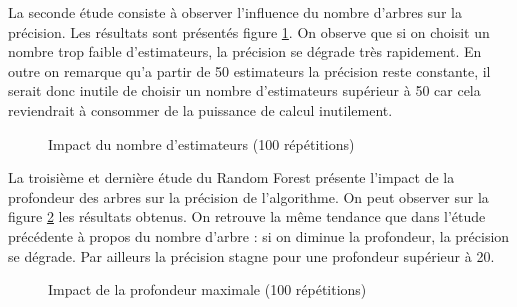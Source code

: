 \documentclass[11pt,a4paper]{article}
\begin{document}
			La seconde étude consiste à observer l'influence du nombre d'arbres sur la précision. Les résultats sont présentés figure \ref{rf_estimators}. On observe que si on choisit un nombre trop faible d'estimateurs, la précision se dégrade très rapidement. En outre on remarque qu'a partir de 50 estimateurs la précision reste constante, il serait donc inutile de choisir un nombre d'estimateurs supérieur à 50 car cela reviendrait à consommer de la puissance de calcul inutilement.

			\begin{figure}
			\begin{center}
				\caption{Impact du nombre d'estimateurs (100 répétitions)}
				\label{rf_estimators}
			\end{center}
			\end{figure}


			La troisième et dernière étude du Random Forest présente l'impact de la profondeur des arbres sur la précision de l'algorithme. On peut observer sur la figure \ref{rf_depth} les résultats obtenus. On retrouve la même tendance que dans l'étude précédente à propos du nombre d'arbre : si on diminue la profondeur, la précision se dégrade. Par ailleurs la précision stagne pour une profondeur supérieur à 20.

			\begin{figure}
				\begin{center}
					\caption{Impact de la profondeur maximale (100 répétitions)}
					\label{rf_depth}
				\end{center}
			\end{figure}
\end{document}
